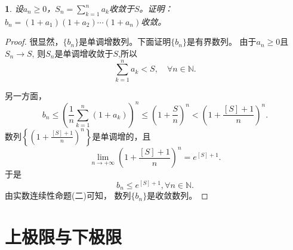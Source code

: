 \documentclass[utf8]{book}
\newtheorem{example}{}[section]             %
\begin{document}
\begin{example}
设$a_n\geq 0$，$S_n=\displaystyle\sum_{k=1}^na_k$收敛于$S$。证明：$b_n=(1+a_1)(1+a_2)\cdots(1+a_n)$收敛。
\end{example}
\begin{proof}
很显然，$\{b_n\}$是单调增数列。下面证明$\{b_n\}$是有界数列。
由于$a_n\geq 0$且$S_n\rightarrow S$, 则$S_n$是单调增收敛于$S$,所以$$\displaystyle\sum_{k=1}^na_k < S,\quad\forall n\in \mathbb{N}.$$

另一方面，
$$b_n\leq \left(\frac{1}{n}\displaystyle\sum_{k=1}^n(1+a_k)\right)^n\leq \left(1+\frac{S}{n}\right)^n <\left(1+\frac{[S]+1}{n}\right)^n.$$
数列$\left\{\left(1+\displaystyle\frac{[S]+1}{n}\right)^n\right\}$是单调增的，且$$\displaystyle  \lim_{n\to +\infty}\left(1+\frac{[S]+1}{n}\right)^n=e^{[S]+1}.$$
于是
$$b_n \leq e^{[S]+1}, \forall n\in\mathbb{N}.$$
由实数连续性命题(二)可知， 数列$\{b_n\}$是收敛数列。
\end{proof}
\section{上极限与下极限}
\end{document}
